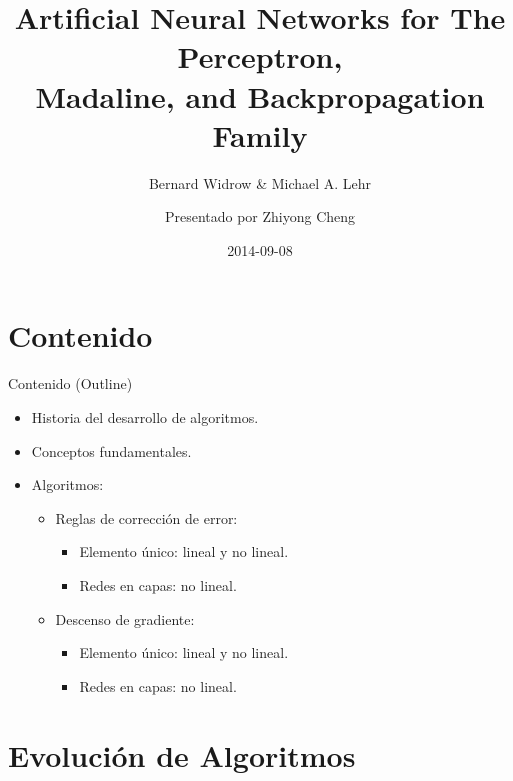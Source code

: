 \documentclass[aspectratio=169,utf8,spanish]{beamer}
\title[ANN: Perceptron, Madaline, Backpropagation]{
  Artificial Neural Networks for The Perceptron,\\
  Madaline, and Backpropagation Family
}
\subtitle{Bernard Widrow \& Michael A. Lehr}
\author{Presentado por Zhiyong Cheng}
\institute{}
\date{2014-09-08}
\begin{document}
\begin{frame}
  \titlepage
\end{frame}

\section{Contenido}

\begin{frame}{Contenido (Outline)}
  \begin{itemize}
    \item Historia del desarrollo de algoritmos.
    \item Conceptos fundamentales.
    \item Algoritmos:
    \begin{itemize}
      \item Reglas de corrección de error:
      \begin{itemize}
        \item Elemento único: lineal y no lineal.
        \item Redes en capas: no lineal.
      \end{itemize}
      \item Descenso de gradiente:
      \begin{itemize}
        \item Elemento único: lineal y no lineal.
        \item Redes en capas: no lineal.
      \end{itemize}
    \end{itemize}
  \end{itemize}
\end{frame}

\section{Evolución de Algoritmos}
\end{document}
